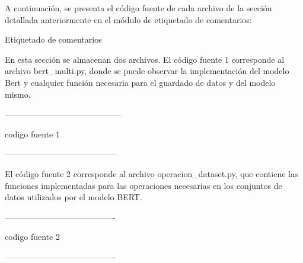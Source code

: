A continuación, se presenta el código fuente de cada archivo de la sección detallada anteriormente en el módulo de etiquetado de comentarios:

Etiquetado de comentarios

En esta sección se almacenan dos archivos. El código fuente 1 corresponde al archivo bert\_multi.py, donde se puede observar la implementación del modelo Bert y cualquier función necesaria para el guardado de datos y del modelo mismo.

------------------------------------------

codigo fuente 1

-----------------------------------------

El código fuente 2 corresponde al archivo operacion\_dataset.py, que contiene las funciones implementadas para las operaciones necesarias en los conjuntos de datos utilizados por el modelo BERT.


----------------------------------------

codigo fuente 2

----------------------------------------